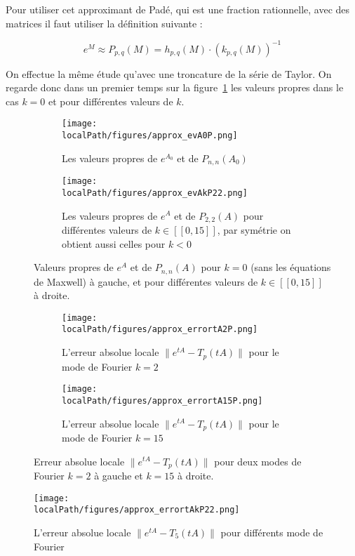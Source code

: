 Pour utiliser cet approximant de Padé, qui est une fraction rationnelle, avec des matrices il faut utiliser la définition suivante :

$$
  e^M \approx P_{p,q}(M) = h_{p,q}(M)\cdot\left(k_{p,q}(M)\right)^{-1}
$$

On effectue la même étude qu'avec une troncature de la série de Taylor. On regarde donc dans un premier temps sur la figure~\ref{fig:evAP22} les valeurs propres dans le cas $k=0$ et pour différentes valeurs de $k$.

\begin{figure}
  \begin{subfigure}{.5\textwidth}
    \centering
    \texttt{[image: \\localPath/figures/approx\_evA0P.png]}
    \caption{Les valeurs propres de $e^{A_0}$ et de $P_{n,n}(A_0)$}
  \end{subfigure}
  \begin{subfigure}{.5\textwidth}
    \centering
    \texttt{[image: \\localPath/figures/approx\_evAkP22.png]}
    \caption{Les valeurs propres de $e^{A}$ et de $P_{2,2}(A)$ pour différentes valeurs de $k\in[\![0,15]\!]$, par symétrie on obtient aussi celles pour $k<0$}
  \end{subfigure}
  \caption{Valeurs propres de $e^{A}$ et de $P_{n,n}(A)$ pour $k=0$ (sans les équations de Maxwell) à gauche, et pour différentes valeurs de $k\in[\![0,15]\!]$ à droite.}
  \label{fig:evAP22}
\end{figure}

\begin{figure}
  \begin{subfigure}{.5\textwidth}
    \centering
    \texttt{[image: \\localPath/figures/approx\_errortA2P.png]}
    \caption{L'erreur absolue locale $\|e^{tA}-T_p(tA)\|$ pour le mode de Fourier $k=2$}
  \end{subfigure}
  \begin{subfigure}{.5\textwidth}
    \centering
    \texttt{[image: \\localPath/figures/approx\_errortA15P.png]}
    \caption{L'erreur absolue locale $\|e^{tA}-T_p(tA)\|$ pour le mode de Fourier $k=15$}
  \end{subfigure}
  \caption{Erreur absolue locale $\|e^{tA}-T_p(tA)\|$ pour deux modes de Fourier $k=2$ à gauche et $k=15$ à droite.}
\end{figure}

\begin{figure}
  \centering
  \texttt{[image: \\localPath/figures/approx\_errortAkP22.png]}
  \caption{L'erreur absolue locale $\|e^{tA}-T_5(tA)\|$ pour différents mode de Fourier}
\end{figure}


